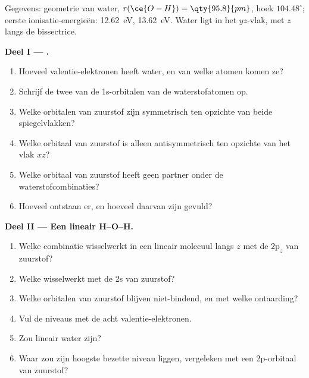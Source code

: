 \begin{problem}
\label{pb:b2:fragment-orbitals:1}
Gegevens: geometrie van water, $r(\ce{O-H}) = \qty{95.8}{pm}$, hoek
$104.48^\circ$; eerste ionisatie-energieën:  \qty{12.62}{eV}, 
\qty{13.62}{eV}. Water ligt in het $yz$-vlak, met $z$ langs de bissectrice.

\medskip
\noindent\textbf{Deel I --- .}
\begin{enumerate}
  \item Hoeveel valentie-elektronen heeft water, en van welke atomen komen ze?
  \item Schrijf de twee  van de 1s-orbitalen van de waterstofatomen op.
  \item Welke orbitalen van zuurstof zijn symmetrisch ten opzichte van beide spiegelvlakken?
  \item Welke orbitaal van zuurstof is alleen antisymmetrisch ten opzichte van het vlak $xz$?
  \item Welke orbitaal van zuurstof heeft geen partner onder de waterstofcombinaties?
  \item Hoeveel  ontstaan er, en hoeveel daarvan zijn gevuld?
\end{enumerate}

\medskip
\noindent\textbf{Deel II --- Een lineair H--O--H.}
\begin{enumerate}[resume]
  \item Welke combinatie wisselwerkt in een lineair molecuul langs $z$ met de
        $2\mathrm p_z$ van zuurstof?
  \item Welke wisselwerkt met de 2s van zuurstof?
  \item Welke orbitalen van zuurstof blijven niet-bindend, en met welke ontaarding?
  \item Vul de niveaus met de acht valentie-elektronen.
  \item Zou lineair water  zijn?
  \item Waar zou zijn hoogste bezette niveau liggen, vergeleken met een 2p-orbitaal
        van zuurstof?
\end{enumerate}


\end{problem}
